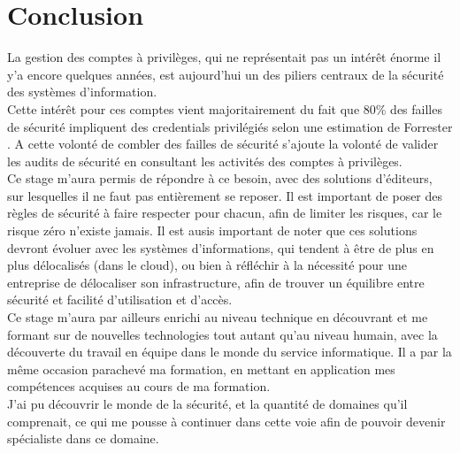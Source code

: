 \section*{Conclusion}


La gestion des comptes à privilèges, qui ne représentait pas un intérêt énorme il y'a encore quelques années, est aujourd'hui un des piliers centraux de la sécurité des systèmes d'information.\\
Cette intérêt pour ces comptes vient majoritairement du fait que 80\% des failles de sécurité impliquent des \glspl{credential} privilégiés selon une estimation de Forrester \cite{acs}. A cette volonté de combler des failles de sécurité s'ajoute la volonté de valider les audits de sécurité en consultant les activités des comptes à privilèges.\\
Ce stage m'aura permis de répondre à ce besoin, avec des solutions d'éditeurs, sur lesquelles il ne faut pas entièrement se reposer. Il est important de poser des règles de sécurité à faire respecter pour chacun, afin de limiter les risques, car le risque zéro n'existe jamais. Il est ausis important de noter que ces solutions devront évoluer avec les systèmes d'informations, qui tendent à être de plus en plus délocalisés (dans le cloud), ou bien à réfléchir à la nécessité pour une entreprise de délocaliser son infrastructure, afin de trouver un équilibre entre sécurité et facilité d'utilisation et d'accès.\\
Ce stage m'aura par ailleurs enrichi au niveau technique en découvrant et me formant sur de nouvelles technologies tout autant qu'au niveau humain, avec la découverte du travail en équipe dans le monde du service informatique. Il a par la même occasion parachevé ma formation, en mettant en application mes compétences acquises au cours de ma formation.\\
J'ai pu découvrir le monde de la sécurité, et la quantité de domaines qu'il comprenait, ce qui me pousse à continuer dans cette voie afin de pouvoir devenir spécialiste dans ce domaine.